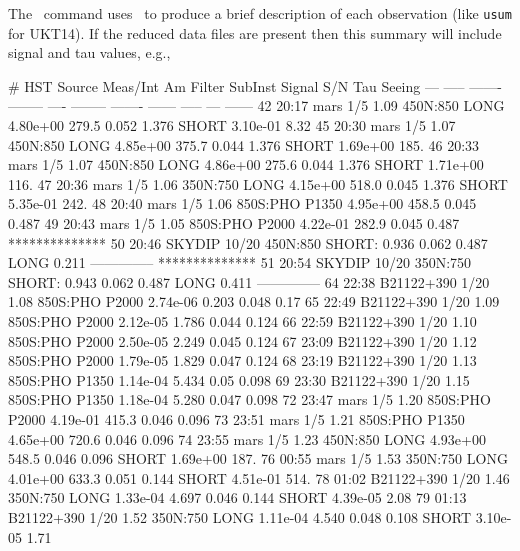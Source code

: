 \documentclass[twoside,11pt,fleqn,noabs]{starlink}
\providecommand{\task}[1]{\textsf{#1}}
\providecommand{\sculog}{\xref{\task{sculog}}{sun216}{SCULOG}}
\providecommand{\photsum}{\xref{\task{photsum}}{sun216}{PHOTSUM}}
\begin{document}
The \photsum\ command uses \sculog\ to produce a brief description
of each observation (like \texttt{usum} for UKT14). If the reduced data
files are present then this summary will include signal and
 tau values, e.g.,
\begin{small}
\begin{terminalv}
 #    HST    Source   Meas/Int  Am   Filter  SubInst Signal   S/N   Tau  Seeing
---  -----   -------  -------- ---- -------- ------- ------  -----  ---  ------
42   20:17   mars        1/5   1.09 450N:850 LONG   4.80e+00 279.5  0.052 1.376
                                             SHORT  3.10e-01 8.32
45   20:30   mars        1/5   1.07 450N:850 LONG   4.85e+00 375.7  0.044 1.376
                                             SHORT  1.69e+00 185.
46   20:33   mars        1/5   1.07 450N:850 LONG   4.86e+00 275.6  0.044 1.376
                                             SHORT  1.71e+00 116.
47   20:36   mars        1/5   1.06 350N:750 LONG   4.15e+00 518.0  0.045 1.376
                                             SHORT  5.35e-01 242.
48   20:40   mars        1/5   1.06 850S:PHO P1350  4.95e+00 458.5  0.045 0.487
49   20:43   mars        1/5   1.05 850S:PHO P2000  4.22e-01 282.9  0.045 0.487
**************
50   20:46   SKYDIP     10/20       450N:850 SHORT:  0.936          0.062 0.487
                                             LONG    0.211
--------------
**************
51   20:54   SKYDIP     10/20       350N:750 SHORT:  0.943          0.062 0.487
                                             LONG    0.411
--------------
64   22:38   B21122+390  1/20  1.08 850S:PHO P2000  2.74e-06 0.203  0.048 0.17
65   22:49   B21122+390  1/20  1.09 850S:PHO P2000  2.12e-05 1.786  0.044 0.124
66   22:59   B21122+390  1/20  1.10 850S:PHO P2000  2.50e-05 2.249  0.045 0.124
67   23:09   B21122+390  1/20  1.12 850S:PHO P2000  1.79e-05 1.829  0.047 0.124
68   23:19   B21122+390  1/20  1.13 850S:PHO P1350  1.14e-04 5.434  0.05  0.098
69   23:30   B21122+390  1/20  1.15 850S:PHO P1350  1.18e-04 5.280  0.047 0.098
72   23:47   mars        1/5   1.20 850S:PHO P2000  4.19e-01 415.3  0.046 0.096
73   23:51   mars        1/5   1.21 850S:PHO P1350  4.65e+00 720.6  0.046 0.096
74   23:55   mars        1/5   1.23 450N:850 LONG   4.93e+00 548.5  0.046 0.096
                                             SHORT  1.69e+00 187.
76   00:55   mars        1/5   1.53 350N:750 LONG   4.01e+00 633.3  0.051 0.144
                                             SHORT  4.51e-01 514.
78   01:02   B21122+390  1/20  1.46 350N:750 LONG   1.33e-04 4.697  0.046 0.144
                                             SHORT  4.39e-05 2.08
79   01:13   B21122+390  1/20  1.52 350N:750 LONG   1.11e-04 4.540  0.048 0.108
                                             SHORT  3.10e-05 1.71
\end{terminalv}
\end{small}
\end{document}

